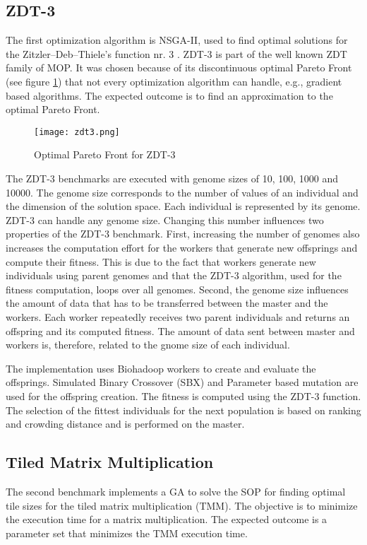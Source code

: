 \subsection{ZDT-3}
\label{chap:evaluation:zdt3}
The first optimization algorithm is NSGA-II, used to find optimal solutions for the Zitzler–Deb–Thiele's function nr. 3 \cite{zitzler2000comparison}. ZDT-3 is part of the well known ZDT family of MOP. It was chosen because of its discontinuous optimal Pareto Front (see figure \ref{fig:zdt3}) that not every optimization algorithm can handle, e.g., gradient based algorithms. The expected outcome is to find an approximation to the optimal Pareto Front.

\begin{figure}
  \centering
  \texttt{[image: zdt3.png]}
  \caption[Optimal Pareto Front for ZDT-3]{Optimal Pareto Front for ZDT-3}
  \label{fig:zdt3}
\end{figure}

The ZDT-3 benchmarks are executed with genome sizes of 10, 100, 1000 and 10000. The genome size corresponds to the number of values of an individual and the dimension of the solution space. Each individual is represented by its genome. ZDT-3 can handle any genome size. Changing this number influences two properties of the ZDT-3 benchmark. First, increasing the number of genomes also increases the computation effort for the workers that generate new offsprings and compute their fitness. This is due to the fact that workers generate new individuals using parent genomes and that the ZDT-3 algorithm, used for the fitness computation, loops over all genomes. Second, the genome size influences the amount of data that has to be transferred between the master and the workers. Each worker repeatedly receives two parent individuals and returns an offspring and its computed fitness. The amount of data sent between master and workers is, therefore, related to the gnome size of each individual.

The implementation uses Biohadoop workers to create and evaluate the offsprings. Simulated Binary Crossover (SBX) and Parameter based mutation \cite{deb2000efficient} are used for the offspring creation. The fitness is computed using the ZDT-3 function. The selection of the fittest individuals for the next population is based on ranking and crowding distance and is performed on the master.

\subsection{Tiled Matrix Multiplication}
\label{chap:evaluation:tiledmul}
The second benchmark implements a GA to solve the SOP for finding optimal tile sizes for the tiled matrix multiplication (TMM). The objective is to minimize the execution time for a matrix multiplication. The expected outcome is a parameter set that minimizes the TMM execution time.

